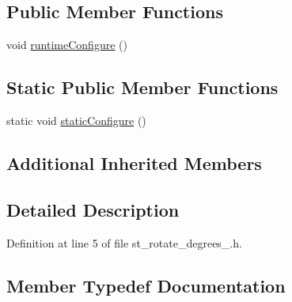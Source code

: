 \subsection*{Public Member Functions}
\begin{DoxyCompactItemize}
\item 
void \hyperlink{structsm__dance__bot__strikes__back_1_1StRotateDegrees1_acc975cf0fb7eb2b7e606f456e96953fa}{runtime\+Configure} ()
\end{DoxyCompactItemize}
\subsection*{Static Public Member Functions}
\begin{DoxyCompactItemize}
\item 
static void \hyperlink{structsm__dance__bot__strikes__back_1_1StRotateDegrees1_a4e1e6d270be9a2d3899176e284ef7860}{static\+Configure} ()
\end{DoxyCompactItemize}
\subsection*{Additional Inherited Members}


\subsection{Detailed Description}


Definition at line 5 of file st\+\_\+rotate\+\_\+degrees\+\_.\+h.



\subsection{Member Typedef Documentation}
\mbox{\label{structsm__dance__bot__strikes__back_1_1StRotateDegrees1_ac753fd21a410d0201e6577ada7edcaa4}} 

